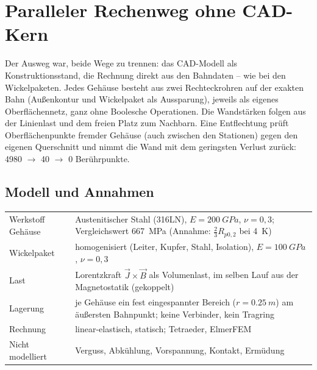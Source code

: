 \documentclass[10pt,a4paper]{article}
\begin{document}
\section{Paralleler Rechenweg ohne CAD-Kern}
Der Ausweg war, beide Wege zu trennen: das CAD-Modell als Konstruktionsstand, die Rechnung direkt aus den
Bahndaten -- wie bei den Wickelpaketen. Jedes Gehäuse besteht aus zwei Rechteckrohren auf der exakten Bahn
(Außenkontur und Wickelpaket als Aussparung), jeweils als eigenes Oberflächennetz, ganz ohne Boolesche
Operationen. Die Wandstärken folgen aus der Linienlast und dem freien Platz zum Nachbarn. Eine Entflechtung
prüft Oberflächenpunkte fremder Gehäuse (auch zwischen den Stationen) gegen den eigenen Querschnitt und nimmt die
Wand mit dem geringsten Verlust zurück: 4980 $\to$ 40 $\to$ 0 Berührpunkte.

\subsection{Modell und Annahmen}
\begin{table}[H]\centering\small
\begin{tabularx}{\linewidth}{@{}lX@{}}\toprule
Werkstoff Gehäuse & Austenitischer Stahl (316LN), $E=\SI{200}{GPa}$, $\nu=0{,}3$; Vergleichswert
  \SI{667}{MPa} (Annahme: $\tfrac23 R_{p0,2}$ bei \SI{4}{K}) \\
Wickelpaket & homogenisiert (Leiter, Kupfer, Stahl, Isolation), $E=\SI{100}{GPa}$, $\nu=0{,}3$ \\
Last & Lorentzkraft $\vec J\times\vec B$ als Volumenlast, im selben Lauf aus der Magnetostatik (gekoppelt) \\
Lagerung & je Gehäuse ein fest eingespannter Bereich ($r=\SI{0,25}{m}$) am äußersten Bahnpunkt; keine
  Verbinder, kein Tragring \\
Rechnung & linear-elastisch, statisch; Tetraeder, ElmerFEM \\
Nicht modelliert & Verguss, Abkühlung, Vorspannung, Kontakt, Ermüdung \\\bottomrule
\end{tabularx}\end{table}
\end{document}
